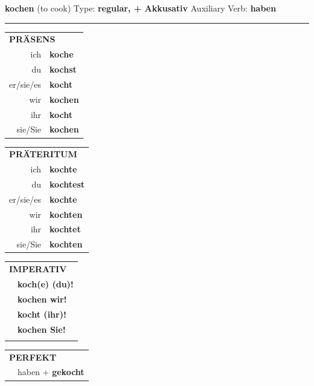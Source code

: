 \documentclass[10pt,a4paper]{revtex4-2}
\begin{document}
\begin{verbbox-acc}
    {\Large \bf kochen} (to cook) \hfill Type: \textbf{regular, + Akkusativ} \hfill Auxiliary Verb: \textbf{haben} 
    
     \vspace{5pt}

    \hrule
    
    \vspace{5pt}

  \begin{tabular}{rl}
     \multicolumn{2}{l}{\textbf{PRÄSENS} }\\
    ich & \textbf{koche}\\
    du & \textbf{kochst}\\
    er/sie/es & \textbf{kocht}\\
    wir & \textbf{kochen}\\
    ihr & \textbf{kocht}\\
    sie/Sie & \textbf{kochen}\\
  \end{tabular}
  \hfill
     \begin{tabular}{rl}
    \multicolumn{2}{l}{\textbf{PRÄTERITUM} }\\
    ich & \textbf{kochte}\\
    du & \textbf{kochtest}\\
    er/sie/es & \textbf{kochte}\\
    wir & \textbf{kochten}\\
    ihr & \textbf{kochtet}\\
    sie/Sie & \textbf{kochten}\\
  \end{tabular}
  \hfill
  \begin{tabular}{rl}
     \multicolumn{2}{l}{\textbf{IMPERATIV} }\\
   & \textbf{koch(e) (du)!}\\
   & \textbf{kochen wir!}\\
   & \textbf{kocht (ihr)!}\\
   & \textbf{kochen Sie!}\\
   & \vspace{10pt}
  \end{tabular}

    \vspace{10pt}

 \begin{tabular}{rl}
     \multicolumn{2}{l}{\textbf{PERFEKT}}\\
   & haben + \textbf{gekocht}\\
  \end{tabular}
\hfill
   \begin{tabular}{rl}
   

\end{tabular}
\end{verbbox-acc}
\end{document}
